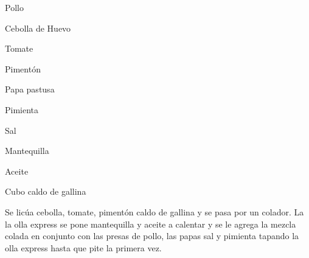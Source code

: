 

\begin{ingredientes}
\item Pollo
\item Cebolla de Huevo
\item Tomate
\item Pimentón
\item Papa pastusa
\item Pimienta
\item Sal
\item Mantequilla
\item Aceite
\item Cubo caldo de gallina
\end{ingredientes}
\preparacion
Se licúa cebolla, tomate, pimentón caldo de gallina y se pasa por un colador. La la olla express se pone mantequilla y aceite a calentar y se le agrega la mezcla colada en conjunto con las presas de pollo, las papas sal y pimienta tapando la olla express hasta que pite la primera vez.


